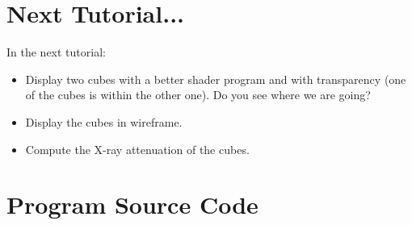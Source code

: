 \documentclass[11pt,oneside,a4paper,final]{article}
\begin{document}
\section{Next Tutorial...}
\label{sec:Next Tutorial}

In the next tutorial:
\begin{itemize}
	\item Display two cubes with a better shader program and with transparency (one of the cubes is within the other one). 
	Do you see where we are going?
	
	\item Display the cubes in wireframe.
	
	\item Compute the X-ray attenuation of the cubes.
\end{itemize}




\appendix
\section{Program Source Code}
\label{sec:Program Source Code}

\begin{center}
  
\end{center}

% 
% 
\end{document}
